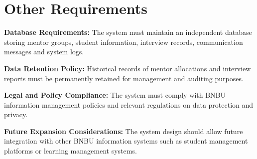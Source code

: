 \section{Other Requirements}

\textbf{Database Requirements:} The system must maintain an independent database storing mentor groups, student information, interview records, communication messages and system logs.

\textbf{Data Retention Policy:} Historical records of mentor allocations and interview reports must be permanently retained for management and auditing purposes.

\textbf{Legal and Policy Compliance:} The system must comply with BNBU information management policies and relevant regulations on data protection and privacy.

\textbf{Future Expansion Considerations:} The system design should allow future integration with other BNBU information systems such as student management platforms or learning management systems.
